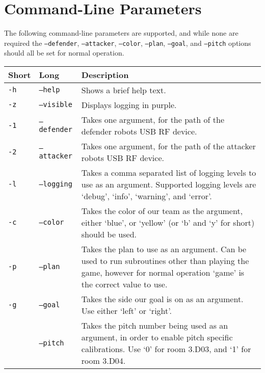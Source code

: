 \section{Command-Line Parameters} \label{params}

The following command-line parameters are supported, and while none are
required the \texttt{--defender}, \texttt{--attacker}, \texttt{--color},
\texttt{--plan}, \texttt{--goal}, and \texttt{--pitch} options should all be
set for normal operation.

\vspace{5mm}

\begin{tabularx}{\textwidth}{ll|X}
    Short       & Long & Description \\
    \hline
    \texttt{-h} & \texttt{--help}     & Shows a brief help text. \\
    \texttt{-z} & \texttt{--visible}  & Displays logging in purple. \\
    \texttt{-1} & \texttt{--defender} & Takes one argument, for the path of the
    defender robots USB RF device. \\
    \texttt{-2} & \texttt{--attacker} & Takes one argument, for the path of the
    attacker robots USB RF device. \\
    \texttt{-l} & \texttt{--logging}  & Takes a comma separated list of
    logging levels to use as an argument. Supported logging levels are `debug',
    `info', `warning', and `error'. \\
    \texttt{-c} & \texttt{--color}    & Takes the color of our team as the
    argument, either `blue', or `yellow' (or `b' and `y' for short) should be
    used. \\
    \texttt{-p} & \texttt{--plan}     & Takes the plan to use as an argument.
    Can be used to run subroutines other than playing the game, however for
    normal operation `game' is the correct value to use. \\
    \texttt{-g} & \texttt{--goal}     & Takes the side our goal is on as an
    argument. Use either `left' or `right'. \\
                & \texttt{--pitch}  & Takes the pitch number being used as an
    argument, in order to enable pitch specific calibrations. Use `0' for room
    3.D03, and `1' for room 3.D04. \\
\end{tabularx}
